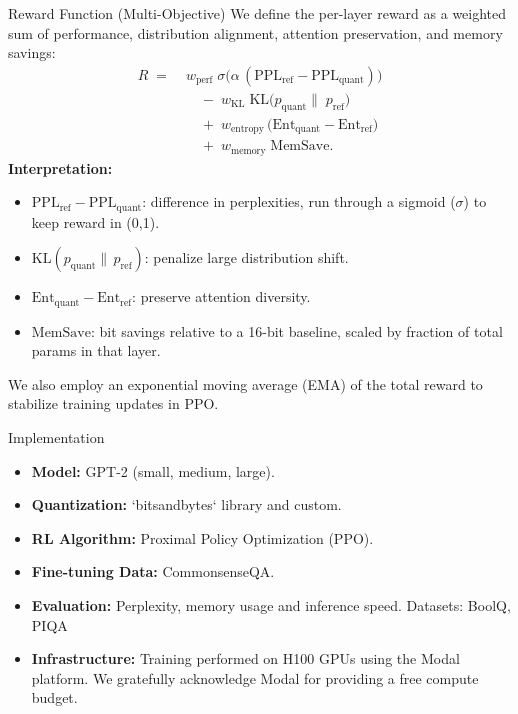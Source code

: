 \documentclass[final]{beamer}
\newlength{\colwidth}
\begin{document}
\begin{frame}[t]
\begin{columns}[t]
\begin{column}{\colwidth}
				\begin{block}{Reward Function (Multi-Objective)}
					We define the per-layer reward as a weighted sum of performance, distribution alignment, attention preservation, and memory savings:
					\[
					\begin{aligned}
						R \;=\; &w_{\mathrm{perf}}\; \sigma\!\bigl(\alpha\,(\mathrm{PPL}_{\mathrm{ref}} - \mathrm{PPL}_{\mathrm{quant}})\bigr) \\
						&\quad -\; w_{\mathrm{KL}}\;\mathrm{KL}\bigl(p_{\mathrm{quant}}\|\;p_{\mathrm{ref}}\bigr) \\
						&\quad +\; w_{\mathrm{entropy}}\,\bigl(\mathrm{Ent}_{\mathrm{quant}} - \mathrm{Ent}_{\mathrm{ref}}\bigr) \\
						&\quad +\; w_{\mathrm{memory}}\;\mathrm{MemSave}.
					\end{aligned}
					\]
					\textbf{Interpretation:}
					\begin{itemize}
						\item \(\mathrm{PPL}_{\mathrm{ref}} - \mathrm{PPL}_{\mathrm{quant}}\): difference in perplexities, run through a sigmoid (\(\sigma\)) to keep reward in (0,1).
						\item \(\mathrm{KL}(p_{\mathrm{quant}}\|\,p_{\mathrm{ref}})\): penalize large distribution shift.
						\item \(\mathrm{Ent}_{\mathrm{quant}} - \mathrm{Ent}_{\mathrm{ref}}\): preserve attention diversity.
						\item \(\mathrm{MemSave}\): bit savings relative to a 16-bit baseline, scaled by fraction of total params in that layer.
					\end{itemize}
					\vspace{0.2em}
					We also employ an exponential moving average (EMA) of the total reward to stabilize training updates in PPO.
				\end{block}
								
				\begin{block}{Implementation}
					\begin{itemize}
						\item \textbf{Model:} GPT-2 (small, medium, large).
						\item \textbf{Quantization:} `bitsandbytes` library and custom.
						\item \textbf{RL Algorithm:} Proximal Policy Optimization (PPO).
						\item \textbf{Fine-tuning Data:} CommonsenseQA.
						\item \textbf{Evaluation:} Perplexity, memory usage and inference speed. Datasets: BoolQ, PIQA
						\item \textbf{Infrastructure:} Training performed on H100 GPUs using the Modal platform. We gratefully acknowledge Modal for providing a free compute budget.
					\end{itemize}
				\end{block}
				

\end{column}
\end{columns}
\end{frame}
\end{document}
